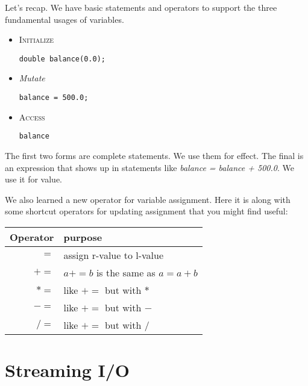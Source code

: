 \documentclass[]{tufte-handout}
\begin{document}
Let's recap. We have basic statements and operators to support the three fundamental usages of variables.
\begin{itemize}
\item \textsc{Initialize} \\
\begin{verbatim}
double balance(0.0);
\end{verbatim}
\item \textit{Mutate} \\
\begin{verbatim}
balance = 500.0;
\end{verbatim}
\item \textsc{Access} \\
\begin{verbatim}
balance
\end{verbatim}
\end{itemize}
The first two forms are complete statements. We use them for effect. The final is an expression that shows up in statements like \textit{balance = balance + 500.0}. We use it for value. 

We also learned a new operator for variable assignment. Here it is along with some shortcut operators for updating assignment that you might find useful:

\begin{center}
\begin{tabular}{rl}
Operator & purpose \\ \hline
$=$ & assign r-value to l-value \\
$+=$ & $a+=b$ is the same as $a = a + b$ \\
$*=$ & like $+=$ but with $*$ \\
$-=$ & like $+=$ but with $-$ \\
$/=$ & like $+=$ but with $/$ 
\end{tabular}
\end{center}

\section{Streaming I/O}
\end{document}
